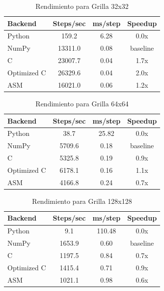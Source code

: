 \documentclass[a4paper]{article}
\begin{document}
\begin{table}[h]
    \centering
    \caption{Rendimiento para Grilla 32x32}
    \begin{tabular}{@{}lccc@{}}
        \toprule
        Backend     & Steps/sec & ms/step & Speedup  \\
        \midrule
        Python      & 159.2     & 6.28    & 0.0x     \\
        NumPy       & 13311.0   & 0.08    & baseline \\
        C           & 23007.7   & 0.04    & 1.7x     \\
        Optimized C & 26329.6   & 0.04    & 2.0x     \\
        ASM         & 16021.0   & 0.06    & 1.2x     \\
        \bottomrule
    \end{tabular}
    \label{tab:perf_32x32}
\end{table}

\begin{table}[h]
    \centering
    \caption{Rendimiento para Grilla 64x64}
    \begin{tabular}{@{}lccc@{}}
        \toprule
        Backend     & Steps/sec & ms/step & Speedup  \\
        \midrule
        Python      & 38.7      & 25.82   & 0.0x     \\
        NumPy       & 5709.6    & 0.18    & baseline \\
        C           & 5325.8    & 0.19    & 0.9x     \\
        Optimized C & 6178.1    & 0.16    & 1.1x     \\
        ASM         & 4166.8    & 0.24    & 0.7x     \\
        \bottomrule
    \end{tabular}
    \label{tab:perf_64x64}
\end{table}

\begin{table}[h]
    \centering
    \caption{Rendimiento para Grilla 128x128}
    \begin{tabular}{@{}lccc@{}}
        \toprule
        Backend     & Steps/sec & ms/step & Speedup  \\
        \midrule
        Python      & 9.1       & 110.48  & 0.0x     \\
        NumPy       & 1653.9    & 0.60    & baseline \\
        C           & 1197.5    & 0.84    & 0.7x     \\
        Optimized C & 1415.4    & 0.71    & 0.9x     \\
        ASM         & 1021.1    & 0.98    & 0.6x     \\
        \bottomrule
    \end{tabular}
    \label{tab:perf_128x128}
\end{table}
\end{document}
